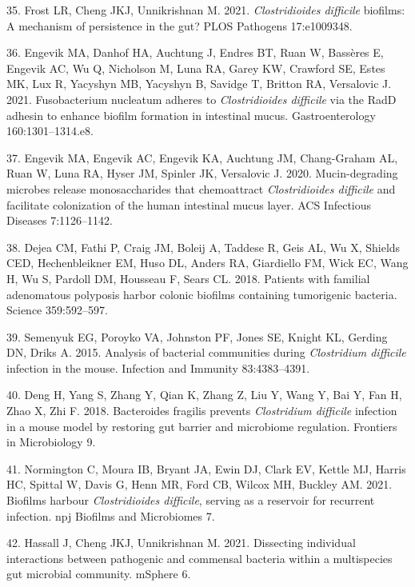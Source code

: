 \documentclass[
  11pt,
]{article}
\begin{document}
\leavevmode\hypertarget{ref-Frost2021}{}%
35. Frost LR, Cheng JKJ, Unnikrishnan M. 2021. \emph{Clostridioides
difficile} biofilms: A mechanism of persistence in the gut? PLOS
Pathogens 17:e1009348.

\leavevmode\hypertarget{ref-Engevik2021}{}%
36. Engevik MA, Danhof HA, Auchtung J, Endres BT, Ruan W, Bassères E,
Engevik AC, Wu Q, Nicholson M, Luna RA, Garey KW, Crawford SE, Estes MK,
Lux R, Yacyshyn MB, Yacyshyn B, Savidge T, Britton RA, Versalovic J.
2021. Fusobacterium nucleatum adheres to \emph{Clostridioides difficile}
via the RadD adhesin to enhance biofilm formation in intestinal mucus.
Gastroenterology 160:1301--1314.e8.

\leavevmode\hypertarget{ref-Engevik2020}{}%
37. Engevik MA, Engevik AC, Engevik KA, Auchtung JM, Chang-Graham AL,
Ruan W, Luna RA, Hyser JM, Spinler JK, Versalovic J. 2020.
Mucin-degrading microbes release monosaccharides that chemoattract
\emph{Clostridioides difficile} and facilitate colonization of the human
intestinal mucus layer. ACS Infectious Diseases 7:1126--1142.

\leavevmode\hypertarget{ref-Dejea2018}{}%
38. Dejea CM, Fathi P, Craig JM, Boleij A, Taddese R, Geis AL, Wu X,
Shields CED, Hechenbleikner EM, Huso DL, Anders RA, Giardiello FM, Wick
EC, Wang H, Wu S, Pardoll DM, Housseau F, Sears CL. 2018. Patients with
familial adenomatous polyposis harbor colonic biofilms containing
tumorigenic bacteria. Science 359:592--597.

\leavevmode\hypertarget{ref-Semenyuk2015}{}%
39. Semenyuk EG, Poroyko VA, Johnston PF, Jones SE, Knight KL, Gerding
DN, Driks A. 2015. Analysis of bacterial communities during
\emph{Clostridium difficile} infection in the mouse. Infection and
Immunity 83:4383--4391.

\leavevmode\hypertarget{ref-Deng2018}{}%
40. Deng H, Yang S, Zhang Y, Qian K, Zhang Z, Liu Y, Wang Y, Bai Y, Fan
H, Zhao X, Zhi F. 2018. Bacteroides fragilis prevents \emph{Clostridium
difficile} infection in a mouse model by restoring gut barrier and
microbiome regulation. Frontiers in Microbiology 9.

\leavevmode\hypertarget{ref-Normington2021}{}%
41. Normington C, Moura IB, Bryant JA, Ewin DJ, Clark EV, Kettle MJ,
Harris HC, Spittal W, Davis G, Henn MR, Ford CB, Wilcox MH, Buckley AM.
2021. Biofilms harbour \emph{Clostridioides difficile}, serving as a
reservoir for recurrent infection. npj Biofilms and Microbiomes 7.

\leavevmode\hypertarget{ref-Hassall2021}{}%
42. Hassall J, Cheng JKJ, Unnikrishnan M. 2021. Dissecting individual
interactions between pathogenic and commensal bacteria within a
multispecies gut microbial community. mSphere 6.
\end{document}
